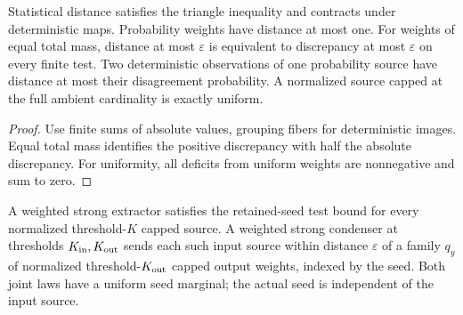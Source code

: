 \begin{theorem}
  \label{thm:lowerbounds-algebraic-weight-distance}
  \leanok
  Statistical distance satisfies the triangle inequality and contracts
  under deterministic maps. Probability weights have distance at most one.
  For weights of equal total mass, distance at most $\varepsilon$ is
  equivalent to discrepancy at most $\varepsilon$ on every finite test.
  Two deterministic observations of one probability source have distance
  at most their disagreement probability. A normalized source capped at
  the full ambient cardinality is exactly uniform.
\end{theorem}
\begin{proof}
  \leanok
  Use finite sums of absolute values, grouping fibers for deterministic
  images. Equal total mass identifies the positive discrepancy with half
  the absolute discrepancy. For uniformity, all deficits from uniform
  weights are nonnegative and sum to zero.
\end{proof}

\begin{definition}
  \label{def:lowerbounds-algebraic-weighted-strong}
  \leanok
  A weighted strong extractor satisfies the retained-seed test bound for
  every normalized threshold-$K$ capped source. A weighted strong condenser
  at thresholds $K_{\rm in},K_{\rm out}$ sends each such input source within
  distance $\varepsilon$ of a family $q_y$ of normalized threshold-$K_{\rm out}$
  capped output weights, indexed by the seed. Both joint laws have a uniform
  seed marginal; the actual seed is independent of the input source.
\end{definition}


